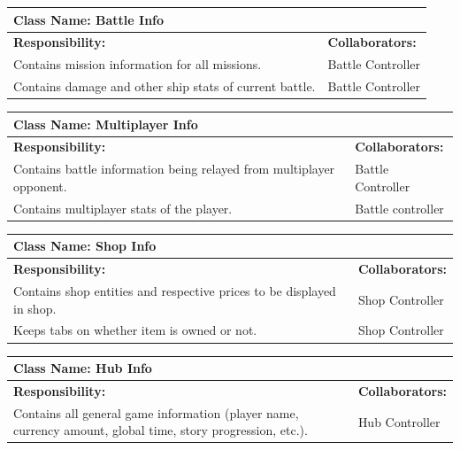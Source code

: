 \documentclass[]{article}
\begin{document}

\begin{table}[H]
	\centering
	\begin{tabular}{|p{8cm}|p{5cm}|}
	\hline 
	 \multicolumn{2}{|l|}{\textbf{Class Name:} Battle Info} \\
	\hline
	\textbf{Responsibility:} & \textbf{Collaborators:} \\
	\hline
	Contains mission information for all missions. &  Battle Controller\\
	\hline
	Contains damage and other ship stats of current battle. & Battle Controller\\
	\hline
\end{tabular}
	
\end{table}
\begin{table}[H]
	\centering
	\begin{tabular}{|p{8cm}|p{5cm}|}
	\hline 
	 \multicolumn{2}{|l|}{\textbf{Class Name:} Multiplayer Info} \\
	\hline
	\textbf{Responsibility:} & \textbf{Collaborators:} \\
	\hline
	Contains battle information being relayed from multiplayer opponent. & Battle Controller \\
	\hline
	Contains multiplayer stats of the player. & Battle controller\\
	\hline
	\end{tabular}
\end{table}

\begin{table}[H]
	\centering
	\begin{tabular}{|p{8cm}|p{5cm}|}
	\hline 
	 \multicolumn{2}{|l|}{\textbf{Class Name:} Shop Info} \\
	\hline
	\textbf{Responsibility:} & \textbf{Collaborators:} \\
	\hline
	Contains shop entities and respective prices to be displayed in shop. & Shop Controller\\
	\hline
	Keeps tabs on whether item is owned or not. & Shop Controller\\
	\hline
	\end{tabular}
\end{table}

\begin{table}[H]
	\centering
	\begin{tabular}{|p{8cm}|p{5cm}|}
	\hline 
	 \multicolumn{2}{|l|}{\textbf{Class Name:} Hub Info} \\
	\hline
	\textbf{Responsibility:} & \textbf{Collaborators:} \\
	\hline
	Contains all general game information (player name, currency amount, global time, story progression, etc.). &  Hub Controller \\
	\hline
	\end{tabular}
\end{table}
\end{document}

